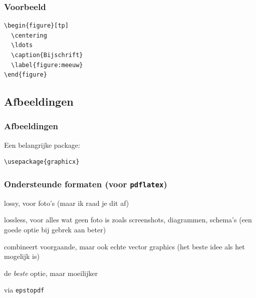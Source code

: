 \begin{frame}[fragile]
  \frametitle{Voorbeeld}
  \begin{verbatim}
\begin{figure}[tp]
  \centering
  \ldots
  \caption{Bijschrift}
  \label{figure:meeuw}
\end{figure}
\end{verbatim}
\end{frame}

\subsection{Afbeeldingen}
\begin{frame}[fragile]
  \frametitle{Afbeeldingen}

  Een belangrijke package:
  \begin{verbatim}
\usepackage{graphicx}
  \end{verbatim}
\end{frame}

\begin{frame}
  \frametitle{Ondersteunde formaten (voor \texttt{pdflatex})}

  \begin{description}[vectorformaten]
    \item[\texttt{jpg}] lossy, voor foto's (maar ik raad je dit af)
    \item[\texttt{png}] lossless, voor alles wat geen foto is zoals screenshots, diagrammen, schema's (een goede optie bij gebrek aan beter)
    \item[\texttt{pdf}] combineert voorgaande, maar ook echte vector graphics (het beste idee als het mogelijk is)
    \item[vectorformaten] de \emph{beste} optie, maar moeilijker
    \item[\texttt{eps}] via \texttt{epstopdf}
  \end{description}
\end{frame}

